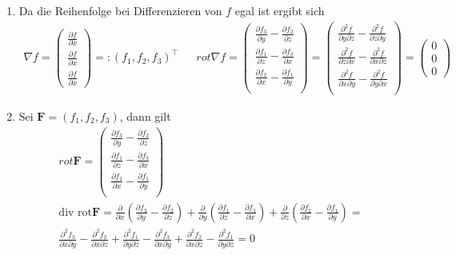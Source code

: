 \documentclass[]{article}
\begin{document}
\begin{enumerate}[label=(\roman*)]
	\item Da die Reihenfolge bei Differenzieren von $f$ egal ist ergibt sich
	\begin{align*}
		\nabla f = \begin{pmatrix}
			\frac{\partial f}{\partial x} \\ \frac{\partial f}{\partial x} \\ \frac{\partial f}{\partial x}
		\end{pmatrix} =: (f_1, f_2, f_3)^\top &&
		rot \nabla f = \begin{pmatrix}
			\frac{\partial f_3}{\partial y} - \frac{\partial f_2}{\partial z}\\
			\frac{\partial f_1}{\partial z} - \frac{\partial f_3}{\partial x}\\
			\frac{\partial f_2}{\partial x} - \frac{\partial f_1}{\partial y}\\
		\end{pmatrix} = \begin{pmatrix} 
		\frac{\partial^2 f}{\partial y \partial z} - \frac{\partial^2 f}{\partial z \partial y}\\
		\frac{\partial^2 f}{\partial z \partial x} - \frac{\partial^2 f}{\partial x \partial z}\\
		\frac{\partial^2 f}{\partial x \partial y} - \frac{\partial^2 f}{\partial y \partial x}\\
		\end{pmatrix} = \begin{pmatrix}
			0 \\ 0 \\ 0
		\end{pmatrix}
	\end{align*}

	\item Sei $\bm{F} = (f_1, f_2, f_3)$, dann gilt
	\begin{align*}
		rot \bm{F} = \begin{pmatrix}
			\frac{\partial f_3}{\partial y} - \frac{\partial f_2}{\partial z}\\
			\frac{\partial f_1}{\partial z} - \frac{\partial f_3}{\partial x}\\
			\frac{\partial f_2}{\partial x} - \frac{\partial f_1}{\partial y}\\
		\end{pmatrix}\\
		\text{div rot} \bm{F} = \frac{\partial}{\partial x} \left(\frac{\partial f_3}{\partial y} - \frac{\partial f_2}{\partial z}\right) + \frac{\partial}{\partial y} \left(\frac{\partial f_1}{\partial z} - \frac{\partial f_3}{\partial x}\right) + \frac{\partial}{\partial z} \left(\frac{\partial f_2}{\partial x} - \frac{\partial f_1}{\partial y}\right) = \\
		\frac{\partial^2 f_3}{\partial x \partial y} - \frac{\partial^2 f_2}{\partial x \partial z} + \frac{\partial^2 f_1}{\partial y \partial z} - \frac{\partial^2 f_3}{\partial x \partial y} + \frac{\partial^2 f_2}{\partial x \partial z} - \frac{\partial^2 f_1}{\partial y \partial z} = 0
	\end{align*}
\end{enumerate}
\newpage
\end{document}
